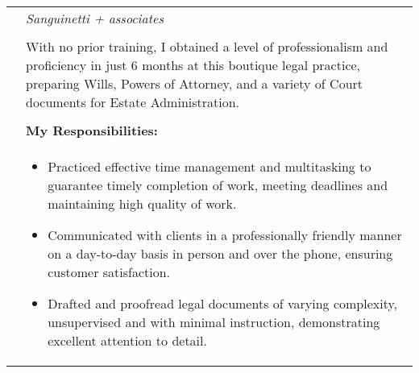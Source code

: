 \documentclass{pike-resume}
\begin{document}
\begin{tabularx}{\textwidth}{p{}X}
                                          & \textit{Sanguinetti + associates} \\
                                          & \\
                                          & With no prior training, I obtained a level of professionalism and proficiency in just 6 months at this boutique legal practice, preparing Wills, Powers of Attorney, and a variety of Court documents for Estate Administration. \\  
                                          & \\
                                          & \textbf{My Responsibilities:}\\  
                                          & \begin{itemize}
                                           \item Practiced effective time management and multitasking to guarantee timely completion of work, meeting deadlines and maintaining high quality of work.
                                           \item Communicated with clients in a professionally friendly manner on a day-to-day basis in person and over the phone, ensuring customer satisfaction.
                                            \item Drafted and proofread legal documents of varying complexity, unsupervised and with minimal instruction, demonstrating excellent attention to detail.
                                            \end{itemize}
\end{tabularx}
				
\bluerule

\vspace{1em}
\end{document}
